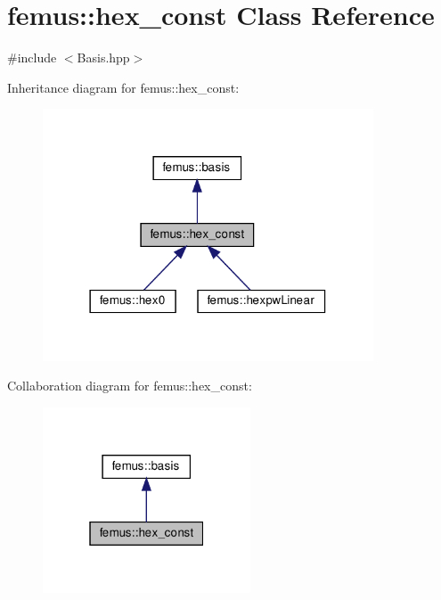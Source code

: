 \hypertarget{classfemus_1_1hex__const}{}\section{femus\+:\+:hex\+\_\+const Class Reference}
\label{classfemus_1_1hex__const}


{\ttfamily \#include $<$Basis.\+hpp$>$}



Inheritance diagram for femus\+:\+:hex\+\_\+const\+:
\nopagebreak
\begin{figure}[H]
\begin{center}
\leavevmode
\includegraphics[width=278pt]{classfemus_1_1hex__const__inherit__graph}
\end{center}
\end{figure}


Collaboration diagram for femus\+:\+:hex\+\_\+const\+:
\nopagebreak
\begin{figure}[H]
\begin{center}
\leavevmode
\includegraphics[width=175pt]{classfemus_1_1hex__const__coll__graph}
\end{center}
\end{figure}

